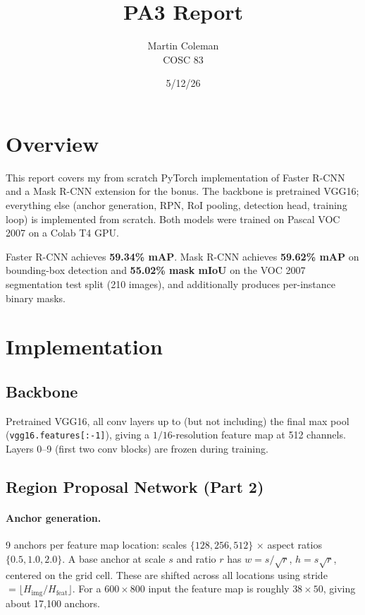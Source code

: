 \documentclass[11pt]{article}
\title{PA3 Report}
\author{Martin Coleman \\ COSC 83}
\date{5/12/26}
\begin{document}
\maketitle

\section{Overview}

This report covers my from scratch PyTorch implementation of Faster R-CNN and a Mask R-CNN extension for the bonus. The backbone is pretrained VGG16; everything else (anchor generation, RPN, RoI pooling, detection head, training loop) is implemented from scratch. Both models were trained on Pascal VOC 2007 on a Colab T4 GPU.

Faster R-CNN achieves \textbf{59.34\% mAP}. Mask R-CNN achieves \textbf{59.62\% mAP} on bounding-box detection and \textbf{55.02\% mask mIoU} on the VOC 2007 segmentation test split (210 images), and additionally produces per-instance binary masks.

\section{Implementation}

\subsection{Backbone}

Pretrained VGG16, all conv layers up to (but not including) the final max pool (\texttt{vgg16.features[:-1]}), giving a $1/16$-resolution feature map at 512 channels. Layers 0--9 (first two conv blocks) are frozen during training.

\subsection{Region Proposal Network (Part 2)}

\paragraph{Anchor generation.}
9 anchors per feature map location: scales $\{128, 256, 512\}$ $\times$ aspect ratios $\{0.5, 1.0, 2.0\}$. A base anchor at scale $s$ and ratio $r$ has $w = s/\sqrt{r}$, $h = s\sqrt{r}$, centered on the grid cell. These are shifted across all locations using stride $= \lfloor H_\text{img} / H_\text{feat} \rfloor$. For a $600\times800$ input the feature map is roughly $38\times50$, giving about 17,100 anchors.
\end{document}
